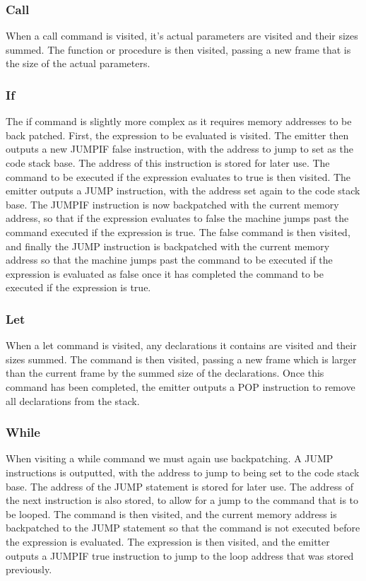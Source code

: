 \documentclass{article}
\begin{document}
\subsubsection{Call}
When a call command is visited, it's actual parameters are visited and their sizes summed. The function or procedure is then visited, passing a new frame that is the size of the actual parameters.

\subsubsection{If}
The if command is slightly more complex as it requires memory addresses to be back patched. First, the expression to be evaluated is visited. The emitter then outputs a new JUMPIF false instruction, with the address to jump to set as the code stack base. The address of this instruction is stored for later use. The command to be executed if the expression evaluates to true is then visited. The emitter outputs a JUMP instruction, with the address set again to the code stack base. The JUMPIF instruction is now backpatched with the current memory address, so that if the expression evaluates to false the machine jumps past the command executed if the expression is true. The false command is then visited, and finally the JUMP instruction is backpatched with the current memory address so that the machine jumps past the command to be executed if the expression is evaluated as false once it has completed the command to be executed if the expression is true.

\subsubsection{Let}
When a let command is visited, any declarations it contains are visited and their sizes summed. The command is then visited, passing a new frame which is larger than the current frame by the summed size of the declarations. Once this command has been completed, the emitter outputs a POP instruction to remove all declarations from the stack.

\subsubsection{While}
When visiting a while command we must again use backpatching. A JUMP instructions is outputted, with the address to jump to being set to the code stack base. The address of the JUMP statement is stored for later use. The address of the next instruction is also stored, to allow for a jump to the command that is to be looped. The command is then visited, and the current memory address is backpatched to the JUMP statement so that the command is not executed before the expression is evaluated. The expression is then visited, and the emitter outputs a JUMPIF true instruction to jump to the loop address that was stored previously.
\end{document}
